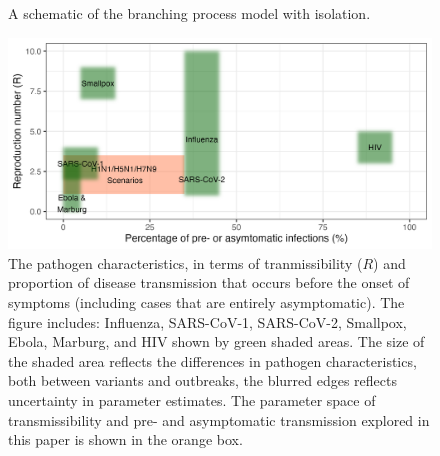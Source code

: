\documentclass{article}
\begin{document}
\begin{figure}[ht]
{
}
\caption{A schematic of the branching process model with isolation.}
\label{fig:ringbp-model}
\end{figure}

\begin{figure}[ht]
\centering
\includegraphics[width=\textwidth]{../plots/patho_param_space.png}
\caption{The pathogen characteristics, in terms of tranmissibility ($R$) and proportion of disease transmission that occurs before the onset of symptoms (including cases that are entirely asymptomatic). The figure includes: Influenza, SARS-CoV-1, SARS-CoV-2, Smallpox, Ebola, Marburg, and HIV shown by green shaded areas. The size of the shaded area reflects the differences in pathogen characteristics, both between variants and outbreaks, the blurred edges reflects uncertainty in parameter estimates. The parameter space of transmissibility and pre- and asymptomatic transmission explored in this paper is shown in the orange box.}
\label{fig:patho-param-space}
\end{figure}
\end{document}
